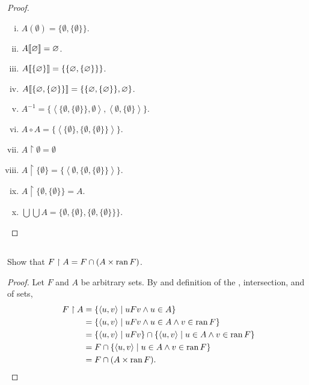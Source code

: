 \documentclass{report}
\begin{document}
\begin{proof}

  \begin{enumerate}[(i)]
    \item $A(\emptyset) = \{\emptyset, \{\emptyset\}\}$.
    \item $A\!\left\llbracket\varnothing\right\rrbracket = \varnothing$.
    \item $A\!\left\llbracket\{\varnothing\}\right\rrbracket = \{\{\varnothing, \{\varnothing\}\}\}$.
    \item $A\!\left\llbracket\{\varnothing, \{\varnothing\}\}\right\rrbracket =
      \{\{\varnothing, \{\varnothing\}\}, \varnothing\}$.
    \item $A^{-1} = \{
      \left< \{\emptyset, \{\emptyset\}\}, \emptyset \right>,
      \left< \emptyset, \{\emptyset\} \right>
    \}$.
    \item $A \circ A =
      \{\left< \{\emptyset\}, \{\emptyset, \{\emptyset\}\} \right>\}$.
    \item $A \restriction \emptyset = \emptyset$
    \item $A \restriction \{\emptyset\} =
      \{\left< \emptyset, \{\emptyset, \{\emptyset\}\} \right>\}$.
    \item $A \restriction \{\emptyset, \{\emptyset\}\} = A$.
    \item $\bigcup\bigcup A =
      \{\emptyset, \{\emptyset\}, \{\emptyset, \{\emptyset\}\}\}$.
  \end{enumerate}

\end{proof}

\subsection{}%
\label{sub:exercise-3.20}

Show that $F \restriction A = F \cap (A \times \mathop{\text{ran}}{F})$.

\begin{proof}

  Let $F$ and $A$ be arbitrary sets.
  By  and definition of the ,
    intersection, and  of sets,
    \begin{align*}
      F \restriction A
        & = \{\left< u, v \right> \mid uFv \land u \in A\} \\
        & = \{\left< u, v \right> \mid
          uFv \land u \in A \land v \in \mathop{\text{ran}}{F}\} \\
        & = \{\left< u, v \right> \mid uFv\} \cap
          \{\left< u, v \right> \mid u \in A \land v \in \mathop{\text{ran}}{F}\} \\
        & = F \cap \{\left< u, v \right> \mid u \in A \land v \in \mathop{\text{ran}}{F}\} \\
        & = F \cap (A \times \mathop{\text{ran}}{F}).
    \end{align*}

\end{proof}
\end{document}
